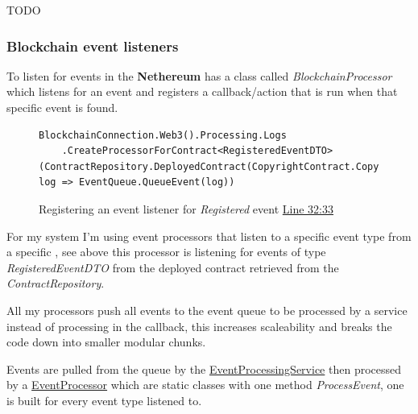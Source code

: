 TODO

\subsubsection{Blockchain event listeners}

To listen for events in the  \textbf{Nethereum} has a class called \textit{BlockchainProcessor} which listens for an event and registers a callback/action that is run when that specific event is found.

\begin{figure}[H]
\caption{Registering an event listener for \textit{Registered} event \href{https://github.com/MrHarrisonBarker/CRPL/blob/main/CRPL.Web/Services/Background/BlockchainEventListener.cs}{Line 32:33}}
\centering
\begin{lstlisting}[language=CSharp]
BlockchainConnection.Web3().Processing.Logs
	.CreateProcessorForContract<RegisteredEventDTO>(ContractRepository.DeployedContract(CopyrightContract.Copyright).Address, log => EventQueue.QueueEvent(log))
\end{lstlisting}
\end{figure}

For my system I'm using event processors that listen to a specific event type from a specific , see above this processor is listening for events of type \textit{RegisteredEventDTO} from the deployed contract retrieved from the \textit{ContractRepository}.

All my processors push all events to the event queue to be processed by a service instead of processing in the callback, this increases scaleability and breaks the code down into smaller modular chunks.

Events are pulled from the queue by the \href{https://github.com/MrHarrisonBarker/CRPL/blob/main/CRPL.Web/Services/Background/EventProcessingService.cs}{EventProcessingService} then processed by a \href{https://github.com/MrHarrisonBarker/CRPL/tree/main/CRPL.Web/Core/EventProcessors}{EventProcessor} which are static classes with one method \textit{ProcessEvent}, one is built for every event type listened to. 


